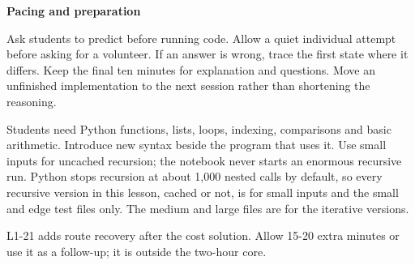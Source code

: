 \documentclass[11pt,a4paper]{article}
\newcommand{\labeltext}[1]{{\color{teal}\textbf{#1}}\par}
\begin{document}
\labeltext{Pacing and preparation}
Ask students to predict before running code. Allow a quiet individual attempt before asking for a volunteer. If an answer is wrong, trace the first state where it differs. Keep the final ten minutes for explanation and questions. Move an unfinished implementation to the next session rather than shortening the reasoning.

Students need Python functions, lists, loops, indexing, comparisons and basic arithmetic. Introduce new syntax beside the program that uses it. Use small inputs for uncached recursion; the notebook never starts an enormous recursive run. Python stops recursion at about 1,000 nested calls by default, so every recursive version in this lesson, cached or not, is for small inputs and the small and edge test files only. The medium and large files are for the iterative versions.

L1-21 adds route recovery after the cost solution. Allow 15-20 extra minutes or use it as a follow-up; it is outside the two-hour core.
\end{document}
